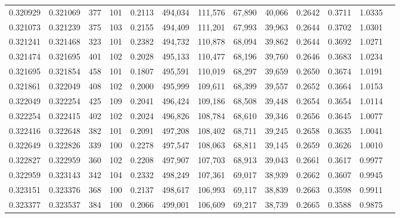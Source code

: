 \begin{tabular}{rrrrrrrrrrrrr}
0.320929 & 0.321069 &   377 & 101 &                                     0.2113 & 494,034 & 111,576 &  67,890 &  40,066 & 0.2642 & 0.3711 & 1.0335 \\
0.321073 & 0.321239 &   375 & 103 &                                     0.2155 & 494,409 & 111,201 &  67,993 &  39,963 & 0.2644 & 0.3702 & 1.0301 \\
0.321241 & 0.321468 &   323 & 101 &                                     0.2382 & 494,732 & 110,878 &  68,094 &  39,862 & 0.2644 & 0.3692 & 1.0271 \\
0.321474 & 0.321695 &   401 & 102 &                                     0.2028 & 495,133 & 110,477 &  68,196 &  39,760 & 0.2646 & 0.3683 & 1.0234 \\
0.321695 & 0.321854 &   458 & 101 &                                     0.1807 & 495,591 & 110,019 &  68,297 &  39,659 & 0.2650 & 0.3674 & 1.0191 \\
0.321861 & 0.322049 &   408 & 102 &                                     0.2000 & 495,999 & 109,611 &  68,399 &  39,557 & 0.2652 & 0.3664 & 1.0153 \\
0.322049 & 0.322254 &   425 & 109 &                                     0.2041 & 496,424 & 109,186 &  68,508 &  39,448 & 0.2654 & 0.3654 & 1.0114 \\
0.322254 & 0.322415 &   402 & 102 &                                     0.2024 & 496,826 & 108,784 &  68,610 &  39,346 & 0.2656 & 0.3645 & 1.0077 \\
0.322416 & 0.322648 &   382 & 101 &                                     0.2091 & 497,208 & 108,402 &  68,711 &  39,245 & 0.2658 & 0.3635 & 1.0041 \\
0.322649 & 0.322826 &   339 & 100 &                                     0.2278 & 497,547 & 108,063 &  68,811 &  39,145 & 0.2659 & 0.3626 & 1.0010 \\
0.322827 & 0.322959 &   360 & 102 &                                     0.2208 & 497,907 & 107,703 &  68,913 &  39,043 & 0.2661 & 0.3617 & 0.9977 \\
0.322959 & 0.323143 &   342 & 104 &                                     0.2332 & 498,249 & 107,361 &  69,017 &  38,939 & 0.2662 & 0.3607 & 0.9945 \\
0.323151 & 0.323376 &   368 & 100 &                                     0.2137 & 498,617 & 106,993 &  69,117 &  38,839 & 0.2663 & 0.3598 & 0.9911 \\
0.323377 & 0.323537 &   384 & 100 &                                     0.2066 & 499,001 & 106,609 &  69,217 &  38,739 & 0.2665 & 0.3588 & 0.9875 \\

\end{tabular}

